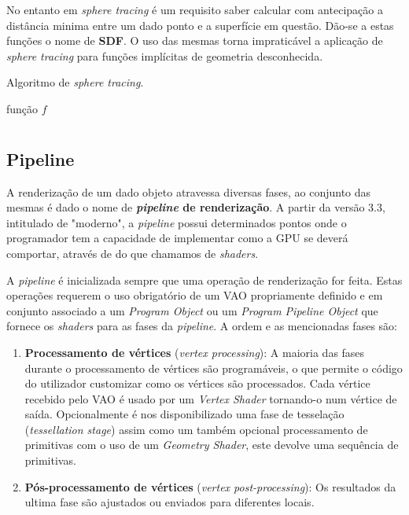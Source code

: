 No entanto em \textit{sphere tracing} é um requisito saber calcular com antecipação a distância minima entre um dado ponto e a superfície em questão. Dão-se a estas funções o nome de \textbf{\ac{SDF}}. O uso das mesmas torna impraticável a aplicação de \textit{sphere tracing} para funções implícitas de geometria desconhecida.


\begin{algorithm}[!htbp]
	\caption{Algoritmo de \textit{sphere tracing}.}
	\label{alg::raymarch_spheretrace}
	\begin{algorithmic}
\Require função $f$      
	\end{algorithmic}
\end{algorithm}


\section{\opengl}
\label{sec::arte:opengl}



\subsection{Pipeline}
A renderização de um dado objeto atravessa diversas fases, ao conjunto das mesmas é dado o nome de \textbf{\textit{pipeline} de renderização}. A partir da versão 3.3, intitulado de "\opengl moderno", a \textit{pipeline} possui determinados pontos onde o programador tem a capacidade de implementar como a \ac{GPU} se deverá comportar, através de do que chamamos de \textit{shaders}.

A \textit{pipeline} é inicializada sempre que uma operação de renderização for feita. Estas operações requerem o uso obrigatório de um \ac{VAO} propriamente definido e em conjunto associado a um \textit{Program Object} ou um \textit{Program Pipeline Object} que fornece os \textit{shaders} para as fases da \textit{pipeline}. 
A ordem e as mencionadas fases são:
\begin{enumerate}
    \item \textbf{Processamento de vértices} (\textit{vertex processing}): 
    A maioria das fases durante o processamento de vértices são programáveis, o que permite o código do utilizador customizar como os vértices são processados.
    Cada vértice recebido pelo \ac{VAO} é usado por um \textit{Vertex Shader} tornando-o num vértice de saída. Opcionalmente é nos disponibilizado uma fase de tesselação (\textit{tessellation stage}) assim como um também opcional processamento de primitivas com o uso de um \textit{Geometry Shader}, este devolve uma sequência de primitivas.
    
    \item \textbf{Pós-processamento de vértices} (\textit{vertex post-processing}):
    Os resultados da ultima fase são ajustados ou enviados para diferentes locais.
\end{enumerate}

